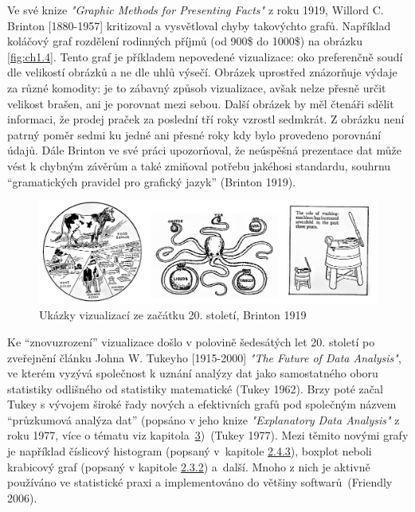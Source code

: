 \documentclass[12pt,]{article}
\begin{document}
\qquad Ve své knize \textit{"Graphic Methods for Presenting Facts"} z
roku 1919, Willord C. Brinton {[}1880-1957{]} kritizoval a vysvětloval
chyby takovýchto grafů. Například koláčový graf rozdělení rodinných
příjmů (od 900\$ do 1000\$) na obrázku \ref{fig:ch1.4}. Tento graf je
příkladem nepovedené vizualizace: oko preferenčně soudí dle velikostí
obrázků a ne dle uhlů výsečí. Obrázek uprostřed znázorňuje výdaje za
různé komodity: je to zábavný způsob vizualizace, avšak nelze přesně
určit velikost brašen, ani je porovnat mezi sebou. Další obrázek by měl
čtenáři sdělit informaci, že prodej praček za poslední tří roky vzrostl
sedmkrát. Z obrázku není patrný poměr sedmi ku jedné ani přesné roky kdy
bylo provedeno porovnání údajů. Dále Brinton ve své práci upozorňoval,
že neúspěšná prezentace dat může vést k chybným závěrům a také zmiňoval
potřebu jakéhosi standardu, souhrnu \enquote{gramatických pravidel pro
grafický jazyk} (Brinton 1919).

\begin{figure}[H]

{\centering \includegraphics[width=1\linewidth]{fig/brinton} 

}

\caption{\label{fig:ch1.4} Ukázky vizualizací ze začátku 20. století, Brinton 1919}\label{fig:brinton}
\end{figure}

\newpage

\qquad Ke \enquote{znovuzrození} vizualizace došlo v polovině šedesátých
let 20. století po zveřejnění článku Johna W. Tukeyho {[}1915-2000{]}
\textit{"The Future of Data Analysis"}, ve kterém vyzývá společnost k
uznání analýzy dat jako samostatného oboru statistiky odlišného od
statistiky matematické (Tukey 1962). Brzy poté začal Tukey s vývojem
široké řady nových a efektivních grafů pod společným názvem
\enquote{průzkumová analýza dat} (popsáno v jeho knize
\textit{"Explanatory Data Analysis"} z roku 1977, více o tématu viz
kapitola~\protect\hyperlink{EDA}{3})~(Tukey 1977). Mezi těmito novými
grafy je například číslicový histogram (popsaný v~kapitole
\protect\hyperlink{stem-and-leaf}{2.4.3}), boxplot neboli krabicový graf
(popsaný v kapitole \protect\hyperlink{boxplot}{2.3.2}) a~další. Mnoho z
nich je aktivně používáno ve statistické praxi a implementováno do
většiny softwarů~(Friendly 2006).
\end{document}
